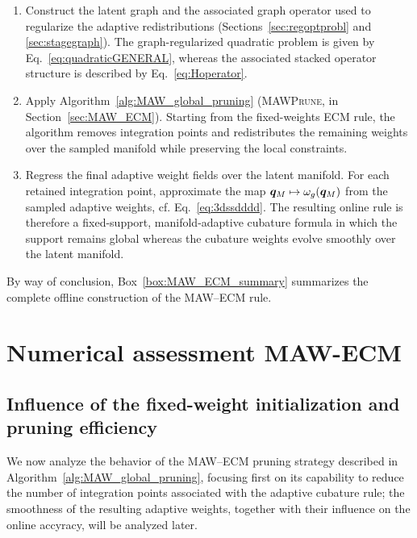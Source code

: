 \documentclass[11pt,a4paper]{article}
\begin{document}
\begin{BOX}
\begin{enumerate}
\item Construct the latent graph and the associated graph operator used to
regularize the adaptive redistributions
(Sections~\ref{sec:regoptprobl} and \ref{sec:stagegraph}). The graph-regularized
quadratic problem is given by Eq.~\eqref{eq:quadraticGENERAL}, whereas the
associated stacked operator structure is described by
Eq.~\eqref{eq:Hoperator}.

\item Apply Algorithm~\ref{alg:MAW_global_pruning}
(\textsc{MAWPrune}, in Section~\ref{sec:MAW_ECM}). Starting from the fixed-weights ECM rule, the algorithm removes integration points   and redistributes
the remaining weights over the sampled manifold while preserving the local
constraints.

\item  Regress the final adaptive weight fields over the latent manifold. For
each retained integration point, approximate the map
\(\bm{q}_M\mapsto\omega_{g}(\bm{q}_M)\)
from the sampled adaptive weights, cf.
Eq.~\eqref{eq:3dssdddd}. The resulting online rule is therefore a fixed-support,
manifold-adaptive cubature formula in which the support remains global whereas
the cubature weights evolve smoothly over the latent manifold.

\end{enumerate}

\end{BOX}



By way of conclusion, Box~\ref{box:MAW_ECM_summary}
summarizes the complete offline construction of the MAW--ECM rule.


\section{Numerical assessment MAW-ECM}
\label{sec:nmaw_ecm}
\subsection{Influence of the fixed-weight initialization and pruning efficiency}


We now analyze the behavior of the MAW--ECM pruning strategy described in Algorithm~\ref{alg:MAW_global_pruning}, focusing first on its capability to reduce the number of integration points associated with the adaptive cubature rule; the smoothness   of the resulting   adaptive weights, together with their influence on the online accyracy, will be analyzed later.
\end{document}
